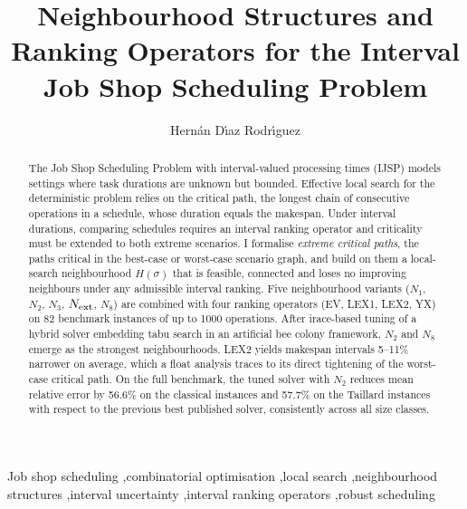 \documentclass[preprint,12pt]{elsarticle}
\begin{document}
\begin{frontmatter}


\title{Neighbourhood Structures and Ranking Operators for the Interval Job Shop Scheduling Problem}

\author[uo]{Hern\'an D\'{\i}az Rodr\'{\i}guez}


\begin{abstract}
The Job Shop Scheduling Problem with interval-valued processing times (IJSP) models settings where task durations are unknown but bounded. Effective local search for the deterministic problem relies on the critical path, the longest chain of consecutive operations in a schedule, whose duration equals the makespan. Under interval durations, comparing schedules requires an interval ranking operator and criticality must be extended to both extreme scenarios. I formalise \emph{extreme critical paths}, the paths critical in the best-case or worst-case scenario graph, and build on them a local-search neighbourhood $H(\sigma)$ that is feasible, connected and loses no improving neighbours under any admissible interval ranking. Five neighbourhood variants ($N_1$, $N_2$, $N_3$, $N_{\rm ext}$, $N_8$) are combined with four ranking operators (EV, LEX1, LEX2, YX) on 82 benchmark instances of up to 1000 operations. After irace-based tuning of a hybrid solver embedding tabu search in an artificial bee colony framework, $N_2$ and $N_8$ emerge as the strongest neighbourhoods. LEX2 yields makespan intervals 5--11\% narrower on average, which a float analysis traces to its direct tightening of the worst-case critical path. On the full benchmark, the tuned solver with $N_2$ reduces mean relative error by 56.6\% on the classical instances and 57.7\% on the Taillard instances with respect to the previous best published solver, consistently across all size classes.
\end{abstract}


\begin{keyword}
Job shop scheduling \sep combinatorial optimisation \sep local search \sep neighbourhood structures \sep interval uncertainty \sep interval ranking operators \sep robust scheduling
\end{keyword}

\end{frontmatter}
\end{document}
